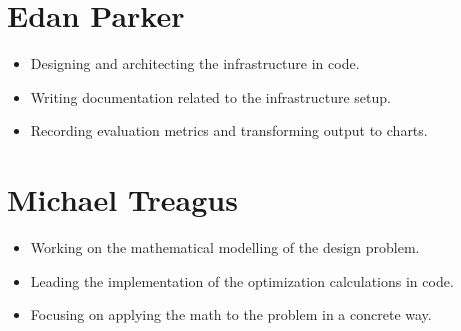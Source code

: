 \documentclass[../mthe-493-project-proposal.tex]{subfiles}
\begin{document}
    \section{Edan Parker}
    \begin{itemize}
        \item Designing and architecting the infrastructure in code.
        \item Writing documentation related to the infrastructure setup.
        \item Recording evaluation metrics and transforming output to charts.
    \end{itemize}

    \section{Michael Treagus}
    \begin{itemize}
        \item Working on the mathematical modelling of the design problem.
        \item Leading the implementation of the optimization calculations in code.
        \item Focusing on applying the math to the problem in a concrete way.
    \end{itemize}
\end{document}
